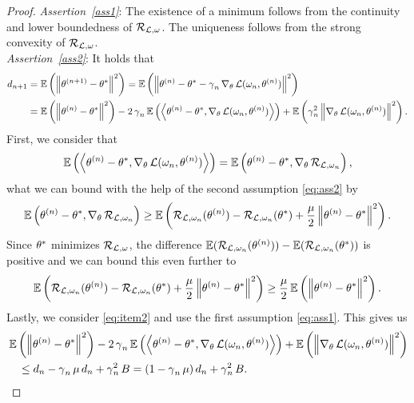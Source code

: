 \begin{proof}
\textit{Assertion~\ref{ass1}}: The existence of a minimum follows from the continuity and lower boundedness of $\risk_{\loss, \o}$. The uniqueness follows from the strong convexity of $\risk_{\loss, \o}$.\\
\textit{Assertion~\ref{ass2}}: It holds that
\begin{align}\label{eq:item2}
d_{n+1} &= \E\left( \left\| \t^{(n+1)} - \t^{\ast} \right\|^2 \right) = \E\left( \left\| \t^{(n)} - \t^{\ast} - \g_n \nabla_{\t} \loss(\o_n, \t^{(n)}) \right\|^2 \right)\nonumber\\
&= \E\left( \left\| \t^{(n)} - \t^{\ast}\right\|^2 \right) - 2\g_n\E\left(\left\langle \t^{(n)}- \t^{\ast}, \nabla_{\t}\loss(\o_n, \t^{(n)}) \right\rangle\right) + \E \left( \g_n^2 \left\| \nabla_{\t} \loss(\o_n, \t^{(n)}) \right\|^2 \right).
\end{align}
First, we consider that
\begin{align*}
\E\left( \left\langle \t^{(n)} - \t^{\ast}, \nabla_{\t}\loss(\o_n, \t^{(n)}) \right\rangle \right)= \E\left( \t^{(n)} - \t^{\ast}, \nabla_{\t} \risk_{\loss, \o_n} \right),
\end{align*}
what we can bound with the help of the second assumption \eqref{eq:ass2} by
\begin{align*}
\E\left( \t^{(n)} - \t^{\ast}, \nabla_{\t} \risk_{\loss, \o_n} \right) \geq
\E\left( \risk_{\loss, \o_n} (\t^{(n)})	 - \risk_{\loss, \o_n} (\t^{\ast}) + \frac{\m}{2} \left\| \t^{(n)} - \t^{\ast} \right\|^2	\right).
\end{align*}
Since $\t^{\ast}$ minimizes $\risk_{\loss, \o}$, the difference $\E(\risk_{\loss, \o_n} (\t^{(n)})) - \E(\risk_{\loss, \o_n} (\t^{\ast}))$ is positive and we can bound this even further to
\begin{align*}
\E\left( \risk_{\loss, \o_n} (\t^{(n)})	 - \risk_{\loss, \o_n} (\t^{\ast}) + \frac{\m}{2} \left\| \t^{(n)} - \t^{\ast} \right\|^2	\right) \geq
\frac{\m}{2}\E\left( \left\| \t^{(n)} - \t^{\ast} \right\|^2\right).
\end{align*}
Lastly, we consider \eqref{eq:item2} and use the first assumption \eqref{eq:ass1}. This gives us
\begin{align*}
&\E\left( \left\| \t^{(n)} - \t^{\ast}\right\|^2 \right) - 2\g_n\E\left(\left\langle \t^{(n)}- \t^{\ast}, \nabla_{\t}\loss(\o_n, \t^{(n)}) \right\rangle\right) + \E \left( \left\| \nabla_{\t} \loss(\o_n, \t^{(n)}) \right\|^2 \right)\\
&\quad\leq d_n - \g_n\m d_n + \g_n^2B = \left(1 - \g_n\m\right)d_n + \g_n^2B.

\end{align*}
\end{proof}
